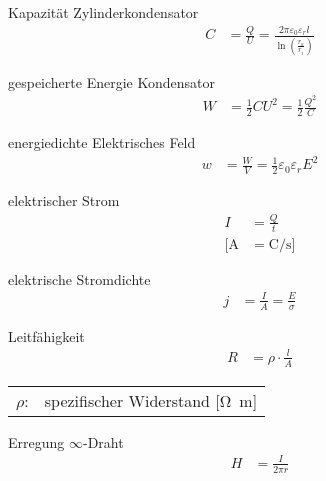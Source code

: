 \begin{karte}{Kapazität Zylinderkondensator}
    \begin{align*}
        C &= \frac{Q}{U} = \frac{ 2 \pi \varepsilon_0 \varepsilon_r l }{ 
            \ln(\frac{r_a}{r_i})
        } 
    \end{align*}
\end{karte}

\begin{karte}{gespeicherte Energie Kondensator}
    \begin{align*}
        W &= \frac{1}{2} C U^2 = \frac{1}{2} \frac{Q^2}{C}
    \end{align*}
\end{karte}

\begin{karte}{energiedichte Elektrisches Feld}
    \begin{align*}
        w &= \frac{W}{V} = \frac{1}{2} \varepsilon_0 \varepsilon_r E^2
    \end{align*}
\end{karte}

\begin{karte}{elektrischer Strom}
    \begin{align*}
        I &= \frac{Q}{t} \\
        \bigg[ \si{\ampere} &= \si{\coulomb\per\second} \bigg]
    \end{align*}
\end{karte}

\begin{karte}{elektrische Stromdichte}
    \begin{align*}
        j &= \frac{I}{A} = \frac{E}{\sigma}
    \end{align*}
\end{karte}

\begin{karte}{Leitfähigkeit}
    \begin{align*}
        R &= \rho \cdot \frac{l}{A}
    \end{align*}
    \begin{tabular}[t]{cl}
        \( \rho \): & spezifischer Widerstand [\si{\ohm\meter}] \\
    \end{tabular}
\end{karte}



\begin{karte}{Erregung \(\infty\)-Draht}
    \begin{align*}
        H &= \frac{I}{2 \pi r}
    \end{align*}
\end{karte}


